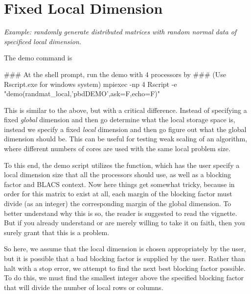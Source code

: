 \section{Fixed Local Dimension}

\emph{Example:  randomly generate distributed matrices with random normal data of specificed local dimension.}

The demo command is
\begin{Command}
### At the shell prompt, run the demo with 4 processors by
### (Use Rscript.exe for windows system)
mpiexec -np 4 Rscript -e "demo(randmat_local,'pbdDEMO',ask=F,echo=F)"
\end{Command}

This is similar to the above, but with a critical difference.  Instead of specifying a fixed \emph{global} dimension and then go determine what the local storage space is, instead we specify a fixed \emph{local} dimension and then go figure out what the global dimension should be.  This can be useful for testing weak scaling of an algorithm, where different numbers of cores are used with the same local problem size.

To this end, the demo script utilizes the  function, which has the user specify a local dimension size that all the processors should use, as well as a blocking factor and BLACS context.  Now here things get somewhat tricky, because in order for this matrix to exist at all, each margin of the blocking factor must divide (as an integer) the corresponding margin of the global dimension.  To better understand why this is so, the reader is suggested to read the  vignette.  But if you already understand or are merely willing to take it on faith, then you surely grant that this is a problem.

So here, we assume that the local dimension is chosen appropriately by the user, but it is possible that a bad blocking factor is supplied by the user.  Rather than halt with a stop error, we attempt to find the next best blocking factor possible.  To do this, we must find the smallest integer above the specified blocking factor that will divide the number of local rows or columns.
